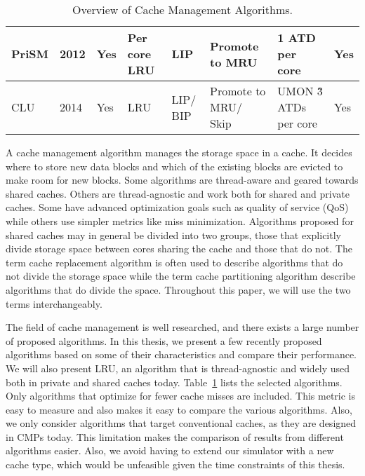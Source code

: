\begin{table}[!htb]
\begin{tabular}{|p{1.4cm}|p{0.5cm}|p{0.8cm}|p{1.2cm}|p{1.2cm}|p{1.2cm}|p{1.2cm}|p{1.0cm}|}
PriSM                           & 2012                           & Yes                         & Per core LRU                  & LIP                            & Promote to MRU                 & 1 ATD per core                       & Yes  \\ \hline
CLU                             & 2014                           & Yes                         & LRU                              & LIP/ BIP                        & Promote to MRU/ Skip            & UMON \~3 ATDs per core                & Yes  \\ \hline
\end{tabular}
\caption{Overview of Cache Management Algorithms.}
\label{tbl:algorithms}
\end{table}
\clearpage

A cache management algorithm manages the storage space in a cache.
It decides where to store new data blocks and which of the existing blocks are evicted to make room for new blocks.
Some algorithms are thread-aware and geared towards shared caches.
Others are thread-agnostic and work both for shared and private caches.
Some have advanced optimization goals such as quality of service (QoS) while others use simpler metrics like miss minimization.
Algorithms proposed for shared caches may in general be divided into two groups, those that explicitly divide storage space between cores sharing the cache and those that do not.
The term cache replacement algorithm is often used to describe algorithms that do not divide the storage space while the term cache partitioning algorithm describe algorithms that do divide the space.
Throughout this paper, we will use the two terms interchangeably.


The field of cache management is well researched, and there exists a large number of proposed algorithms.
In this thesis, we present a few recently proposed algorithms based on some of their characteristics and compare their performance.
We will also present LRU, an algorithm that is thread-agnostic and widely used both in private and shared caches today.
Table~\ref{tbl:algorithms} lists the selected algorithms.
Only algorithms that optimize for fewer cache misses are included.
This metric is easy to measure and also makes it easy to compare the various algorithms.
Also, we only consider algorithms that target conventional caches, as they are designed in CMPs today.
This limitation makes the comparison of results from different algorithms easier.
Also, we avoid having to extend our simulator with a new cache type, which would be unfeasible given the time constraints of this thesis.

